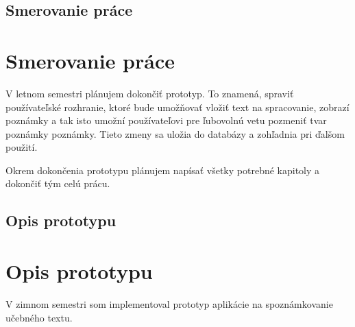 %
%
{
	\section{Smerovanie práce} 
}
{
	\chapter{Smerovanie práce}
}
V letnom semestri plánujem dokončiť prototyp. To znamená, spraviť používateľské rozhranie, ktoré bude umožňovať vložiť text na spracovanie, zobrazí poznámky a tak isto umožní používateľovi pre ľubovolnú vetu pozmeniť tvar poznámky poznámky. Tieto zmeny sa uložia do databázy a zohľadnia pri ďalšom použití.

Okrem dokončenia prototypu plánujem napísať všetky potrebné kapitoly a dokončiť tým celú prácu.

%
%
{
	\section{Opis prototypu} 
}
{
	\chapter{Opis prototypu}
}
V zimnom semestri som implementoval prototyp aplikácie na spoznámkovanie učebného textu.

